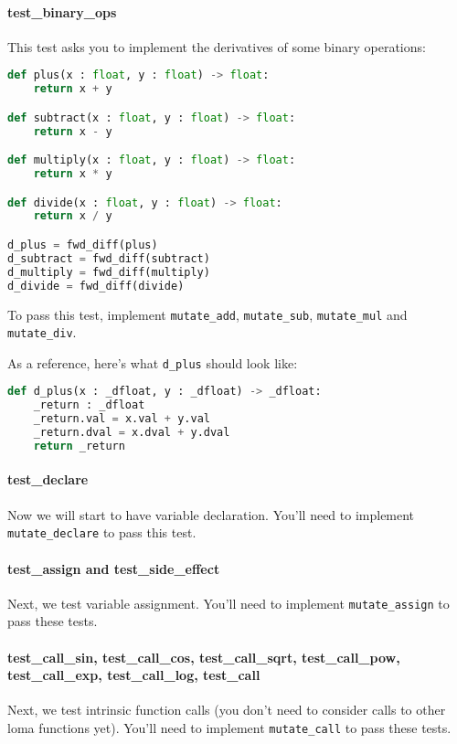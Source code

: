 \paragraph{test_binary_ops} This test asks you to implement the derivatives of some binary operations:
\begin{lstlisting}[language=Python]
def plus(x : float, y : float) -> float:
    return x + y

def subtract(x : float, y : float) -> float:
    return x - y

def multiply(x : float, y : float) -> float:
    return x * y

def divide(x : float, y : float) -> float:
    return x / y

d_plus = fwd_diff(plus)
d_subtract = fwd_diff(subtract)
d_multiply = fwd_diff(multiply)
d_divide = fwd_diff(divide)
\end{lstlisting}
To pass this test, implement \lstinline{mutate_add}, \lstinline{mutate_sub}, \lstinline{mutate_mul} and \lstinline{mutate_div}.

As a reference, here's what \lstinline{d_plus} should look like:
\begin{lstlisting}[language=Python]
def d_plus(x : _dfloat, y : _dfloat) -> _dfloat:
    _return : _dfloat
    _return.val = x.val + y.val
    _return.dval = x.dval + y.dval
    return _return
\end{lstlisting}

\paragraph{test_declare} Now we will start to have variable declaration. You'll need to implement \lstinline{mutate_declare} to pass this test.

\paragraph{test_assign and test_side_effect} Next, we test variable assignment. You'll need to implement \lstinline{mutate_assign} to pass these tests.

\paragraph{test_call_sin, test_call_cos, test_call_sqrt, test_call_pow, test_call_exp, test_call_log, test_call} Next, we test intrinsic function calls (you don't need to consider calls to other loma functions yet). You'll need to implement \lstinline{mutate_call} to pass these tests.

